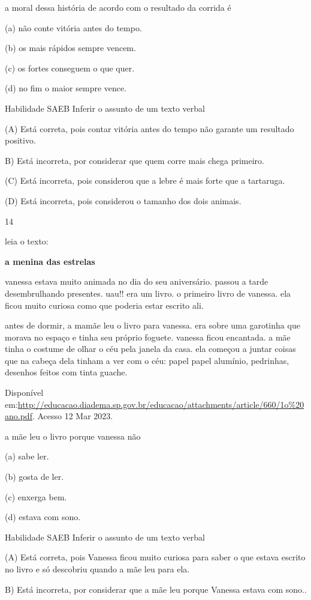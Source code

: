 {{{{{{a moral dessa história de acordo com o resultado da corrida é

(a) não conte vitória antes do tempo.

(b) os mais rápidos sempre vencem.

(c) os fortes conseguem o que quer.

(d) no fim o maior sempre vence.

Habilidade SAEB Inferir o assunto de um texto verbal

(A) Está correta, pois contar vitória antes do tempo não garante um
resultado positivo.

B) Está incorreta, por considerar que quem corre mais chega primeiro.

(C) Está incorreta, pois considerou que a lebre é mais forte que a
tartaruga.

(D) Está incorreta, pois considerou o tamanho dos dois animais.

\num{14}

leia o texto:

\textbf{a menina das estrelas}

vanessa estava muito animada no dia do seu aniversário. passou a tarde
desembrulhando presentes. uau!! era um livro. o primeiro livro de
vanessa. ela ficou muito curiosa como que poderia estar escrito ali.

antes de dormir, a mamãe leu o livro para vanessa. era sobre uma
garotinha que morava no espaço e tinha seu próprio foguete. vanessa
ficou encantada. a mãe tinha o costume de olhar o céu pela janela da
casa. ela começou a juntar coisas que na cabeça dela tinham a ver com o
céu: papel papel alumínio, pedrinhas, desenhos feitos com tinta guache.

Disponível
em:\url{http://educacao.diadema.sp.gov.br/educacao/attachments/article/660/1o\%20ano.pdf}.
Acesso 12 Mar 2023.

a mãe leu o livro porque vanessa não

(a) sabe ler.

(b) gosta de ler.

(c) enxerga bem.

(d) estava com sono.

Habilidade SAEB Inferir o assunto de um texto verbal

(A) Está correta, pois Vanessa ficou muito curiosa para saber o que
estava escrito no livro e só descobriu quando a mãe leu para ela.

B) Está incorreta, por considerar que a mãe leu porque Vanessa estava
com sono..

}}}}}}
